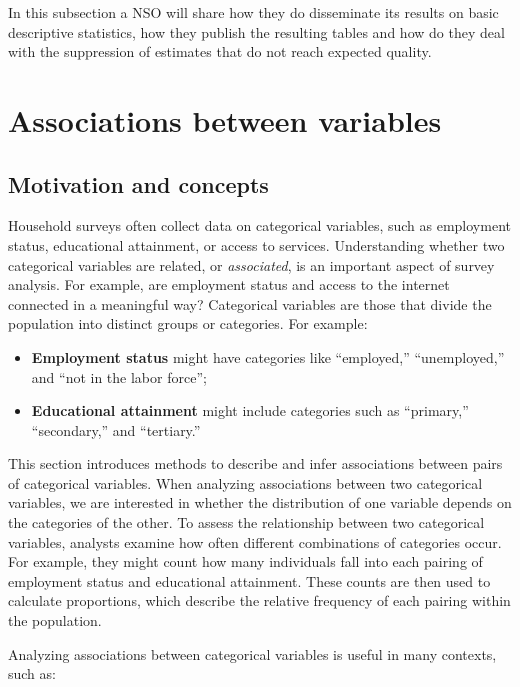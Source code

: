 \documentclass[
  12pt,
]{book}
\begin{document}
In this subsection a NSO will share how they do disseminate its results on basic descriptive statistics, how they publish the resulting tables and how do they deal with the suppression of estimates that do not reach expected quality.

\hypertarget{associations-between-variables}{%
\chapter{Associations between variables}\label{associations-between-variables}}

\hypertarget{motivation-and-concepts}{%
\section{Motivation and concepts}\label{motivation-and-concepts}}

Household surveys often collect data on categorical variables, such as employment status, educational attainment, or access to services. Understanding whether two categorical variables are related, or \emph{associated}, is an important aspect of survey analysis. For example, are employment status and access to the internet connected in a meaningful way? Categorical variables are those that divide the population into distinct groups or categories. For example:

\begin{itemize}
\item
  \textbf{Employment status} might have categories like ``employed,'' ``unemployed,'' and ``not in the labor force'';
\item
  \textbf{Educational attainment} might include categories such as ``primary,'' ``secondary,'' and ``tertiary.''
\end{itemize}

This section introduces methods to describe and infer associations between pairs of categorical variables. When analyzing associations between two categorical variables, we are interested in whether the distribution of one variable depends on the categories of the other. To assess the relationship between two categorical variables, analysts examine how often different combinations of categories occur. For example, they might count how many individuals fall into each pairing of employment status and educational attainment. These counts are then used to calculate proportions, which describe the relative frequency of each pairing within the population.

Analyzing associations between categorical variables is useful in many contexts, such as:
\end{document}
